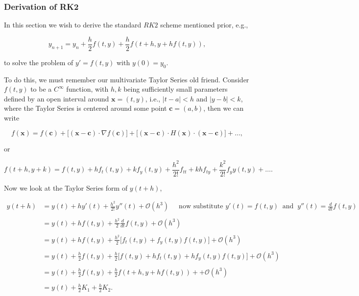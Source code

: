 \documentclass[paper=a4, fontsize=11pt]{scrartcl} %
\numberwithin{equation}{section} %
\numberwithin{figure}{section} %
\numberwithin{table}{section} %
\begin{document}
\subsubsection{Derivation of RK2}

In this section we wish to derive the standard $RK2$ scheme mentioned prior, e.g., 

\begin{equation}
\label{RK2} y_{n+1} = y_n + \frac{h}{2} f(t,y) + \frac{h}{2} f(t+h,y+hf(t,y)),
\end{equation}

to solve the problem of $y'=f(t,y)$ with $y(0)=y_0.$

To do this, we must remember our multivariate Taylor Series old friend. Consider $f(t,y)$ to be a $C^{\infty}$ function, with $h,k$ being sufficiently small parameters defined by an open interval around $\textbf{x}=(t,y)$, i.e., $|t-a|<h$ and $|y-b|<k$, where the Taylor Series is centered around some point $\textbf{c}=(a,b)$, then we can write

$$f(\textbf{x}) = f(\textbf{c}) + \big[ (\textbf{x}-\textbf{c})\cdot \nabla f(\textbf{c}) \big] + \big[  (\textbf{x}-\textbf{c})\cdot H(\textbf{x}) \cdot (\textbf{x}-\textbf{c})  \big] + \dots,$$

or

$$f(t+h,y+k) = f(t,y) + hf_t(t,y) + kf_y(t,y) + \frac{h^2}{2!}f_{tt} + khf_{ty} + \frac{k^2}{2!}f_yy(t,y) + \ldots.$$

Now we look at the Taylor Series form of $y(t+h)$, 

\begin{align*}
y(t+h) &= y(t) + hy'(t) + \frac{h^2}{2!} y''(t) + \mathcal{O}(h^3) \ \ \ \ \ \mbox{ now substitute } y'(t)=f(t,y)\ \mbox{ and } \ y''(t) = \frac{d}{dt} f(t,y) \\ \\
	&= y(t) + hf(t,y) + \frac{h^2}{2}  \frac{d}{dt} f(t,y) + \mathcal{O}(h^3) \\ \\
	&= y(t) + hf(t,y) + \frac{h^2}{2} \big[ f_t(t,y) + f_y(t,y)f(t,y) \big] + \mathcal{O}(h^3) \\ \\
	&= y(t) + \frac{h}{2}f(t,y) + \frac{h}{2} \big[  f(t,y) + hf_t(t,y) + h f_y(t,y) f(t,y) \big] +  \mathcal{O}(h^3) \\ \\
	&= y(t) + \frac{h}{2}f(t,y) + \frac{h}{2} f(t+h,y+hf(t,y)) + + \mathcal{O}(h^3) \\ \\
	&= y(t) + \frac{h}{2} K_1 + \frac{h}{2} K_2. \\ 
\end{align*}
\end{document}
